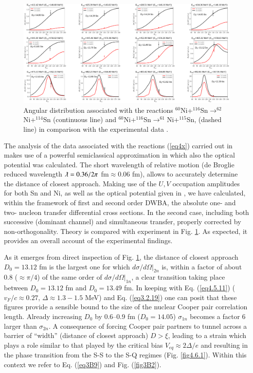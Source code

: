     \begin{figure}
	\centerline{\includegraphics*[width=18cm,angle=0]{C8/figsC8/SnNi2n_v4}}
	\caption{Angular distribution associated with the reactions $^{60}$Ni+$^{116}$Sn$\to^{62}$Ni+$^{114}$Sn (continuous line) and $^{60}$Ni+$^{116}$Sn$\to^{61}$Ni+$^{115}$Sn, (dashed line) in comparison with the experimental  data \citep{Montanari:14}.}\label{fig7.3.1}
\end{figure}



The analysis of the data associated with the reactions (\ref{eq4x})  carried out in \cite{Montanari:14,Montanari:16} makes use of a powerful semiclassical approximation in which also the optical potential was calculated. The short wavelength of relative motion (de Broglie reduced wavelength $\lambdabar=0.36/2\pi$ fm$\approx0.06$ fm), allows to accurately determine the distance of closest approach. Making use of the $U,V$ occupation amplitudes for both Sn and Ni, as well as the optical potential given in \cite{Montanari:14}, we have calculated, within the framework of first and second order DWBA, the absolute one- and two- nucleon transfer differential cross sections.  In the second case, including both successive (dominant channel) and simultaneous transfer, properly corrected by non-orthogonality. Theory is compared with experiment in Fig. \ref{fig7.3.1}. As expected, it provides an overall account of the experimental findings.

As it emerges from direct inspection of Fig. \ref{fig7.3.1}, the distance of closest approach $D_0=13.12$ fm is the largest one for which $d\sigma /d\Omega|_{2n}$ is, within a factor of about 0.8 ($\approx\pi/4$) of the same order of $d\sigma /d\Omega|_{1n}$, a clear transition taking place between $D_0=13.12$ fm and $D_0=13.49$ fm. In keeping with Eq. (\ref{eq4.5.11}) ($v_F/c\approx0.27$, $\Delta\approx1.3-1.5$ MeV) and Eq. (\ref{eq3.2.19}) one can posit that these figures provide a sensible bound to the size of the nuclear Cooper pair correlation length. Already increasing $D_0$ by 0.6--0.9 fm ($D_0=14.05$) $\sigma_{1n}$ becomes a factor 6 larger than $\sigma_{2n}$. A consequence  of forcing Cooper pair partners to tunnel across a barrier of ``width'' (distance of closest approach) $D>\xi$, leading to a strain which plays a role similar to that played by the critical bias $V_{eq}\approx2\Delta/e$ and resulting in the phase transition from the S-S to the S-Q regimes (Fig. \ref{fig4.6.1}). Within this context we refer to Eq. (\ref{eq3B9}) and Fig. (\ref{fig3B2}).
